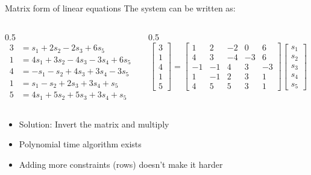 \ifdefined\PRESENTATION\else\PassOptionsToClass{handout}{beamer}\fi\documentclass[aspectratio=169, lualatex]{beamer}
\begin{document}
\begin{frame}{Matrix form of linear equations}
	The system can be written as:
	\begin{columns}[c]
		\begin{column}{0.5\textwidth}
			\begin{align*}
				3 & = s_1 + 2s_2 - 2s_3 + 6s_5         \\
				1 & = 4s_1 + 3s_2 - 4s_3 - 3s_4 + 6s_5 \\
				4 & = -s_1 - s_2 + 4s_3 + 3s_4 - 3s_5  \\
				1 & = s_1 - s_2 + 2s_3 + 3s_4 + s_5    \\
				5 & = 4s_1 + 5s_2 + 5s_3 + 3s_4 + s_5
			\end{align*}
		\end{column}
		\begin{column}{0.5\textwidth}
			\[
				\begin{bmatrix}
					3 \\ 1 \\ 4 \\ 1 \\ 5
				\end{bmatrix}
				=
				\begin{bmatrix}
					1  & 2  & -2 & 0  & 6  \\
					4  & 3  & -4 & -3 & 6  \\
					-1 & -1 & 4  & 3  & -3 \\
					1  & -1 & 2  & 3  & 1  \\
					4  & 5  & 5  & 3  & 1
				\end{bmatrix}
				\begin{bmatrix}
					s_1 \\ s_2 \\ s_3 \\ s_4 \\ s_5
				\end{bmatrix}
			\]
		\end{column}
	\end{columns}
	\vspace{3mm}
	\begin{itemize}
		\item Solution: Invert the matrix and multiply
		\item Polynomial time algorithm exists
		\item Adding more constraints (rows) doesn't make it harder
	\end{itemize}
\end{frame}
\end{document}
